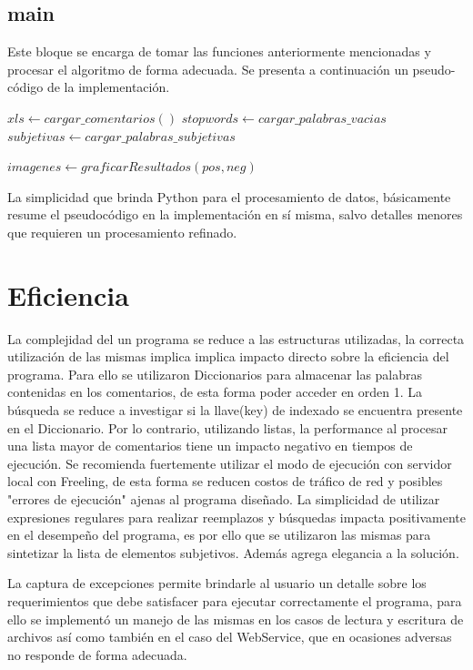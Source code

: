 \documentclass[12pt]{article}
\begin{document}
\subsection{main}
Este bloque se encarga de tomar las funciones anteriormente mencionadas y procesar el algoritmo de forma adecuada.
Se presenta a continuación un pseudo-código de la implementación.

\begin{algorithmic}
  \State $xls \gets cargar\_comentarios()$
  \State $stopwords \gets cargar\_palabras\_vacias$
  \State $subjetivas \gets cargar\_palabras\_subjetivas$
  
     \EndFor
  \EndFor
  
  \State $imagenes \gets graficarResultados(pos, neg)$
\end{algorithmic}

La simplicidad que brinda Python para el procesamiento de datos, básicamente resume el pseudocódigo en la implementación en sí misma, salvo detalles menores que requieren un procesamiento refinado.


\section{Eficiencia}
La complejidad del un programa se reduce a las estructuras utilizadas, la correcta utilización de las mismas implica implica impacto directo sobre la eficiencia del programa. Para ello se utilizaron Diccionarios para almacenar las palabras contenidas en los comentarios, de esta forma poder acceder en orden 1. La búsqueda se reduce a investigar si la llave(key) de indexado se encuentra presente en el Diccionario. Por lo contrario, utilizando listas, la performance al procesar una lista mayor de comentarios tiene un impacto negativo en tiempos de ejecución.
Se recomienda fuertemente utilizar el modo de ejecución con servidor local con Freeling, de esta forma se reducen costos de tráfico de red y posibles "errores de ejecución" ajenas al programa diseñado.
La simplicidad de utilizar expresiones regulares para realizar reemplazos y búsquedas impacta positivamente en el desempeño del programa, es por ello que se utilizaron las mismas para sintetizar la lista de elementos subjetivos. Además agrega elegancia a la solución.

La captura de excepciones permite brindarle al usuario un detalle sobre los requerimientos que debe satisfacer para ejecutar correctamente el programa, para ello se implementó un manejo de las mismas en los casos de lectura y escritura de archivos así como también en el caso del WebService, que en ocasiones adversas no responde de forma adecuada.
\end{document}
